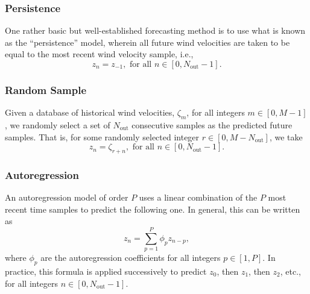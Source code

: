 \documentclass[11pt, oneside]{article}
\begin{document}
\subsubsection{Persistence}
One rather basic but well-established forecasting method is to use what is known as the ``persistence'' model, wherein all future wind velocities are taken to be equal to the most recent wind velocity sample, i.e.,
\begin{equation}
z_n = z_{-1}, \text{ for all } n \in [0, N_\text{out} - 1].
\end{equation}

\subsubsection{Random Sample}
Given a database of historical wind velocities, $\zeta_m$, for all integers $m \in [0, M-1]$, we randomly select a set of $N_\text{out}$ consecutive samples as the predicted future samples.
That is, for some randomly selected integer $r \in [0, M - N_\text{out}]$, we take
\begin{equation}
z_n = \zeta_{r+n}, \text{ for all } n \in [0, N_\text{out} - 1].
\end{equation}

\subsubsection{Autoregression}\label{sec:Methods:Autoregression}
An autoregression model of order $P$ uses a linear combination of the $P$ most recent time samples to predict the following one.
In general, this can be written as
\begin{equation}
z_n = \sum_{p = 1}^P \phi_p z_{n-p},
\end{equation}
where $\phi_p$ are the autoregression coefficients for all integers $p \in [1, P]$.
In practice, this formula is applied successively to predict $z_0$, then $z_1$, then $z_2$, etc., for all integers $n \in [0, N_\text{out} - 1]$.
\end{document}
